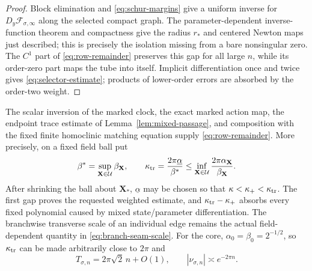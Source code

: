 \documentclass[11pt]{amsart}
\numberwithin{equation}{section}
\theoremstyle{definition}
\theoremstyle{remark}
\newcommand{\cU}{\mathcal U}
\begin{document}
\begin{proof}
Block elimination and \eqref{eq:schur-margins} give a uniform inverse for
$D_y\mathcal F_{\sigma,\infty}$ along the selected compact graph.  The
parameter-dependent inverse-function theorem and compactness give the
radius $r_*$ and centered Newton maps just described; this is precisely the
isolation missing from a bare nonsingular zero.
The $C^1$ part of \eqref{eq:row-remainder} preserves this gap for all large
$n$, while its order-zero part maps the tube into itself.  Implicit
differentiation once and twice gives \eqref{eq:selector-estimate}; products
of lower-order errors are absorbed by the order-two weight.
\end{proof}

The scalar inversion of the marked clock, the exact marked action map, the
endpoint trace estimate of Lemma~\ref{lem:mixed-passage}, and composition with
the fixed finite homoclinic matching equation supply \eqref{eq:row-remainder}.  More
precisely, on a fixed field ball put
\begin{equation}\label{eq:local-full-rate}
 \beta^*=\sup_{\mathbf X\in\cU}\beta_{\mathbf X},\qquad
 \kappa_{\rm tr}=\frac{2\pi\underline\alpha}{\beta^*}
 \le \inf_{\mathbf X\in\cU}
       \frac{2\pi\alpha_{\mathbf X}}{\beta_{\mathbf X}}.
\end{equation}
After shrinking the ball about $\mathbf X_*$, $\underline\alpha$ may be
chosen so that
$\kappa<\kappa_+<\kappa_{\rm tr}$.  The first gap proves the requested
weighted estimate, and $\kappa_{\rm tr}-\kappa_+$ absorbs every fixed
polynomial caused by mixed state/parameter differentiation.  The branchwise
transverse scale of an individual edge remains the actual field-dependent
quantity in \eqref{eq:branch-seam-scale}.  For the core,
$\alpha_0=\beta_0=2^{-1/2}$, so $\kappa_{\rm tr}$ can be made arbitrarily
close to $2\pi$ and
\begin{equation}\label{eq:core-winding-scale}
 T_{\sigma,n}=2\pi\sqrt2\,n+O(1),
 \qquad |\nu_{\sigma,n}|\asymp e^{-2\pi n}.
\end{equation}
\end{document}
